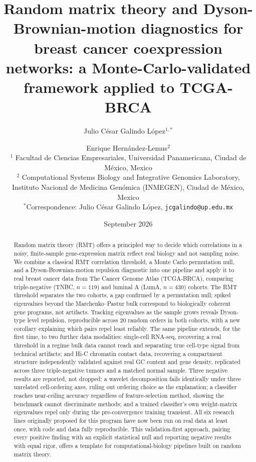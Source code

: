 \documentclass[11pt]{article}
\title{Random matrix theory and Dyson-Brownian-motion diagnostics for \\
breast cancer coexpression networks: a Monte-Carlo-validated \\
framework applied to TCGA-BRCA}
\author{
Julio C\'esar Galindo L\'opez$^{1,*}$ \and Enrique Hern\'andez-Lemus$^{2}$
\\[4pt]
{\small $^{1}$ Facultad de Ciencias Empresariales, Universidad Panamericana, Ciudad de M\'exico, Mexico}\\
{\small $^{2}$ Computational Systems Biology and Integrative Genomics Laboratory,}\\
{\small Instituto Nacional de Medicina Gen\'omica (INMEGEN), Ciudad de M\'exico, Mexico}\\[6pt]
{\small $^{*}$Correspondence: Julio C\'esar Galindo L\'opez, \texttt{jcgalindo@up.edu.mx}}
}
\date{September 2026}
\begin{document}
\maketitle

\begin{abstract}
\noindent
Random matrix theory (RMT) offers a principled way to decide which
correlations in a noisy, finite-sample gene-expression matrix reflect
real biology and not sampling noise. We combine a classical RMT
correlation threshold, a Monte Carlo permutation null, and a
Dyson-Brownian-motion repulsion diagnostic into one pipeline and apply
it to real breast cancer data from The Cancer Genome Atlas (TCGA-BRCA),
comparing triple-negative (TNBC, $n=119$) and luminal A (LumA,
$n=430$) cohorts. The RMT threshold separates the two cohorts, a gap
confirmed by a permutation null; spiked eigenvalues beyond the
Marchenko--Pastur bulk correspond to biologically coherent gene
programs, not artifacts. Tracking eigenvalues as the sample grows
reveals Dyson-type level repulsion, reproducible across 20 random
orders in both cohorts, with a new corollary explaining which pairs
repel least reliably. The same pipeline extends, for the first time,
to two further data modalities: single-cell RNA-seq, recovering a real
threshold in a regime bulk data cannot reach and separating true
cell-type signal from technical artifacts; and Hi-C chromatin contact
data, recovering a compartment structure independently validated
against real GC content and gene density, replicated across three
triple-negative tumors and a matched normal sample. Three negative
results are reported, not dropped: a wavelet decomposition fails
identically under three unrelated cell-ordering axes, ruling out
ordering choice as the explanation; a classifier reaches near-ceiling
accuracy regardless of feature-selection method, showing the benchmark
cannot discriminate methods; and a trained classifier's own
weight-matrix eigenvalues repel only during the pre-convergence
training transient. All six research lines originally proposed for
this program have now been run on real data at least once, with code
and data fully reproducible. This validation-first approach, pairing
every positive finding with an explicit statistical null and reporting
negative results with equal rigor, offers a template for
computational-biology pipelines built on random matrix theory.
\end{abstract}
\end{document}
